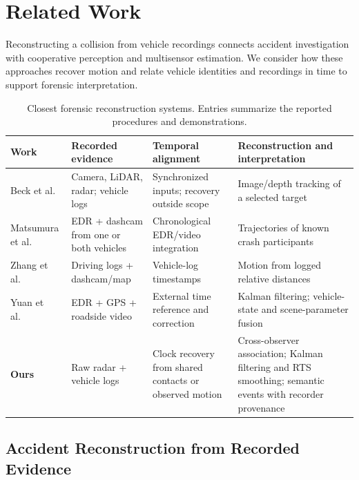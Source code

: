 \section{Related Work}
\label{sec:related-work}

Reconstructing a collision from vehicle recordings connects accident
investigation with cooperative perception and multisensor estimation.
We consider how these approaches recover motion and relate vehicle
identities and recordings in time to support forensic interpretation.

\begin{table}[!t]
\caption{Closest forensic reconstruction systems. Entries summarize the
reported procedures and demonstrations.}
\label{tab:closest-reconstruction}
\centering
\footnotesize
\renewcommand{\arraystretch}{1.15}
\begin{tabular*}{\textwidth}{@{\extracolsep{\fill}}p{}p{}p{}p{}@{}}
\hline
\textbf{Work} & \textbf{Recorded evidence} & \textbf{Temporal alignment} & \textbf{Reconstruction and interpretation} \\
\hline
Beck et al.~\cite{beck2023pipeline} &
Camera, LiDAR, radar; vehicle logs &
Synchronized inputs; recovery outside scope &
Image/depth tracking of a selected target \\
Matsumura et al.~\cite{matsumura2024precrash} &
EDR + dashcam from one or both vehicles &
Chronological EDR/video integration &
Trajectories of known crash participants \\
Zhang et al.~\cite{zhang2025reverse} &
Driving logs + dashcam/map &
Vehicle-log timestamps &
Motion from logged relative distances \\
Yuan et al.~\cite{yuan2026multisource} &
EDR + GPS + roadside video &
External time reference and correction &
Kalman filtering; vehicle-state and scene-parameter fusion \\
\hline
\textbf{Ours} &
Raw radar + vehicle logs  &
Clock recovery from shared contacts or observed motion &
Cross-observer association; Kalman filtering and RTS smoothing;
semantic events with recorder provenance \\
\hline
\end{tabular*}
\end{table}

\subsection{Accident Reconstruction from Recorded Evidence}


